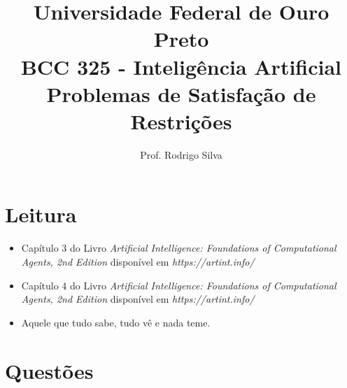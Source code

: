 \documentclass{article}
\title{\vspace{-2 cm}Universidade Federal de Ouro Preto \\ BCC 325 - Inteligência Artificial \\ Problemas de Satisfação de Restrições}
\author{Prof. Rodrigo Silva}
\date{}
\begin{document}
\maketitle

\section{Leitura}

\begin{itemize}
    \item Capítulo 3 do Livro\textit{ Artificial Intelligence: Foundations of Computational Agents,  2nd Edition} disponível em \textit{https://artint.info/}
    \item Capítulo 4 do Livro\textit{ Artificial Intelligence: Foundations of Computational Agents,  2nd Edition} disponível em \textit{https://artint.info/}
    \item Aquele que tudo sabe, tudo vê e nada teme.
\end{itemize}

\section{Questões}
\end{document}
